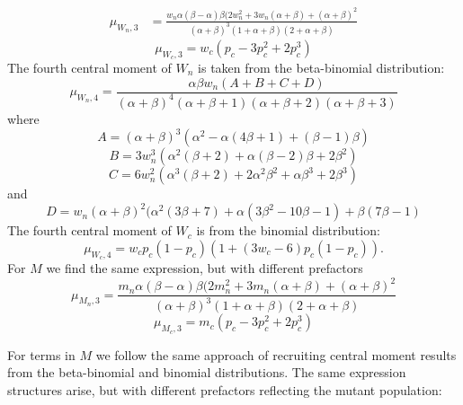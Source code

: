 \documentclass{article}
\begin{document}
\begin{appendices}
{\begin{equation}
    \begin{split}
    \mu_{W_n,3}&=\frac{w_n\alpha(\beta-\alpha)\beta(2w_n^2+3w_n(\alpha+\beta)+(\alpha+\beta)^2}{(\alpha+\beta)^3(1+\alpha+\beta)(2+\alpha+\beta)}
    \end{split}
\end{equation}
\begin{equation}
    \mu_{W_c,3}=w_c(p_c-3p_c^2+2p_c^3)
\end{equation}
The fourth central moment of $W_n$ is taken from the beta-binomial distribution:
\begin{equation}
    \mu_{W_n,4}=\frac{\alpha\beta w_n(A+B+C+D)}{(\alpha +\beta )^4 (\alpha +\beta +1) (\alpha +\beta +2) (\alpha +\beta +3)}
\end{equation}
where
\begin{equation*}
    A = (\alpha +\beta )^3 \left(\alpha ^2-\alpha  (4 \beta +1)+(\beta -1) \beta \right)
\end{equation*}
\begin{equation*}
    B = 3w_n^3\left(\alpha ^2 (\beta +2)+\alpha  (\beta -2) \beta +2 \beta ^2\right)
\end{equation*}
\begin{equation*}
    C = 6w_n^2\left(\alpha ^3 (\beta +2)+2 \alpha ^2 \beta ^2+\alpha  \beta ^3+2 \beta ^3\right)
\end{equation*}
and
\begin{equation*}
    D = w_n(\alpha +\beta )^2(\alpha ^2 (3 \beta +7)+\alpha  (3 \beta ^2-10 \beta -1)+\beta  (7 \beta -1)
\end{equation*}
The fourth central moment of $W_c$ is from the binomial distribution:
\begin{equation}
    \mu_{W_c,4}=w_cp_c(1-p_c)(1+(3w_c-6)p_c(1-p_c)).
\end{equation}
For $M$ we find the same expression, but with different prefactors
\begin{equation}
    \mu_{M_n,3}=\frac{m_n\alpha(\beta-\alpha)\beta(2m_n^2+3m_n(\alpha+\beta)+(\alpha+\beta)^2}{(\alpha+\beta)^3(1+\alpha+\beta)(2+\alpha+\beta)}
\end{equation}
\begin{equation}
    \mu_{M_c,3}=m_c(p_c-3p_c^2+2p_c^3)
\end{equation}

For terms in $M$ we follow the same approach of recruiting central moment results from the beta-binomial and binomial distributions. The same expression structures arise, but with different prefactors reflecting the mutant population:

}
\end{appendices}
\end{document}
